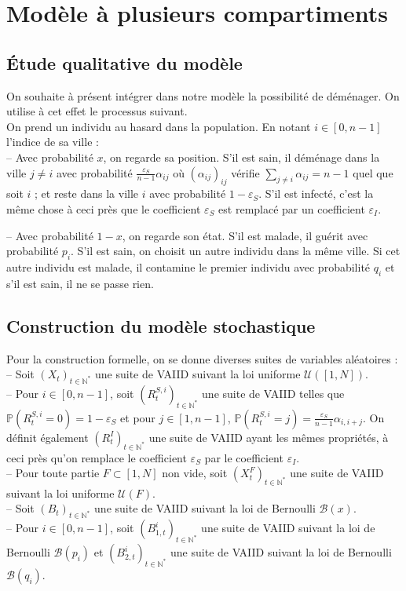 \documentclass[a4paper,10.9pt]{article}
\newcommand{\prob}{\mathbb{P}}
\begin{document}
\section{Modèle à plusieurs compartiments}

\subsection{Étude qualitative du modèle}
On souhaite à présent intégrer dans notre modèle la possibilité de déménager. On utilise à cet effet le processus suivant. \\

On prend un individu au hasard dans la population. En notant $i \in [0,n-1]$ l'indice de sa ville : \\
-- Avec probabilité $x$, on regarde sa position. S'il est sain, il déménage dans la ville $j\neq i$ avec probabilité $\frac{\varepsilon_{S}}{n-1} \alpha_{ij}$ où $(\alpha_{ij})_{ij}$ vérifie $\sum_{j \neq i} \alpha_{ij} = n-1$ quel que soit $i$ ; et reste dans la ville $i$ avec probabilité $1-\varepsilon_S$. S'il est infecté, c'est la même chose à ceci près que le coefficient $\varepsilon_S$ est remplacé par un coefficient $\varepsilon_I$.

-- Avec probabilité $1-x$, on regarde son état. S'il est malade, il guérit avec probabilité $p_i$. S'il est sain, on choisit un autre individu dans la même ville. Si cet autre individu est malade, il contamine le premier individu avec probabilité $q_i$ et s'il est sain, il ne se passe rien. \\

\subsection{Construction du modèle stochastique}

Pour la construction formelle, on se donne diverses suites de variables aléatoires : \\
-- Soit $(X_t)_{t \in \mathbb{N}^*}$ une suite de VAIID suivant la loi uniforme $\mathcal{U}([1,N])$. \\
-- Pour $i \in [0,n-1]$, soit $(R^{S,i}_t)_{t \in \mathbb{N}^*}$ une suite de VAIID telles que $\prob(R^{S,i}_t=0)=1- \varepsilon_S$ et pour $j \in [1,n-1]$, $\prob(R^{S,i}_t=j)=\frac{\varepsilon_S}{n-1} \alpha_{i,i+j}$. On définit également  $(R^I_t)_{t \in \mathbb{N}^*}$ une suite de VAIID ayant les mêmes propriétés, à ceci près qu'on remplace le coefficient $\varepsilon_S$ par le coefficient $\varepsilon_I$. \\
-- Pour toute partie $F \subset [1,N]$ non vide, soit $(X^F_{t})_{t \in \mathbb{N}^*}$ une suite de VAIID suivant la loi uniforme $\mathcal{U}(F)$. \\
-- Soit $(B_t)_{t \in \mathbb{N}^*}$ une suite de VAIID suivant la loi de Bernoulli $\mathcal{B}(x)$. \\
-- Pour $i \in [0,n-1]$, soit $(B^i_{1,t})_{t \in \mathbb{N}^*}$ une suite de VAIID suivant la loi de Bernoulli $\mathcal{B}(p_i)$ et $(B^i_{2,t})_{t \in \mathbb{N}^*}$ une suite de VAIID suivant la loi de Bernoulli $\mathcal{B}(q_i)$. \\
\end{document}
